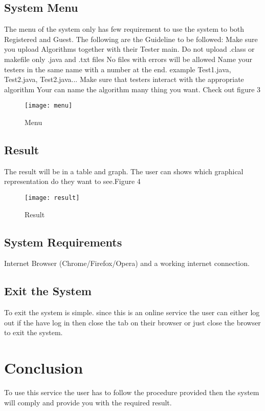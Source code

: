 \documentclass[runningheads,a4paper]{article}
\begin{document}
\subsection{System Menu}
The menu of the system only has few requirement to use the system to both Registered and Guest. The following are the Guideline to be followed:\newline\newline
Make sure you upload Algorithms together with their Tester main.\newline
Do not upload .class or makefile only .java and .txt files \newline
No files with errors will be allowed\newline
Name your testers in the same name with a number at the end. example Test1.java, Test2.java, Test2.java...\newline
Make sure that testers interact with the appropriate algorithm\newline
Your can name the algorithm many thing you want.\newline
Check out figure 3

\begin{figure}[htp]
\centering
\texttt{[image: menu]}
\caption{Menu}
\label{fig:lion}
\end{figure}

\subsection{Result}
The result will be in a table and graph. The user can shows which graphical representation do they want to see.Figure 4
\begin{figure}[htp]
\centering
\texttt{[image: result]}
\caption{Result}
\label{fig:lion}
\end{figure}
\subsection{System Requirements}
	Internet Browser (Chrome/Firefox/Opera) and a working internet connection.
\subsection{Exit the System}
To exit the system is simple. since this is an online service the user can either log out if the have log in then close the tab on their browser or just close the browser to exit the system.
\section{Conclusion}
To use this service the user has to follow the procedure provided then the system will comply and provide you with the required result.
\end{document}
